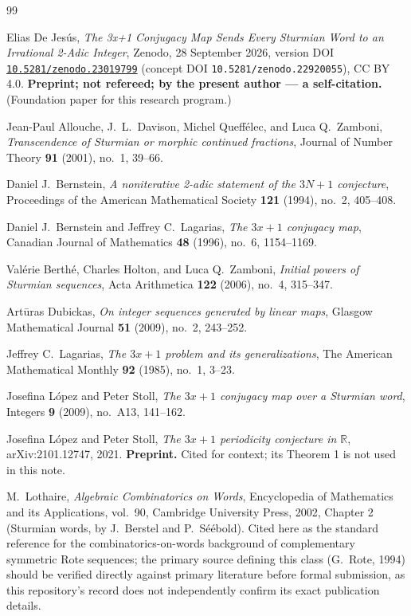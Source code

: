 \documentclass[11pt]{article}
\begin{document}
\begin{thebibliography}{99}

 Elias De Jesús, \emph{The 3x+1 Conjugacy Map Sends Every Sturmian Word to an Irrational 2-Adic Integer}, Zenodo, 28 September 2026, version DOI \href{https://doi.org/10.5281/zenodo.23019799}{\texttt{10.5281/zenodo.23019799}} (concept DOI \texttt{10.5281/zenodo.22920055}), CC BY 4.0. \textbf{Preprint; not refereed; by the present author --- a self-citation.} (Foundation paper for this research program.)

 Jean-Paul Allouche, J.\ L.\ Davison, Michel Queffélec, and Luca Q.\ Zamboni, \emph{Transcendence of Sturmian or morphic continued fractions}, Journal of Number Theory \textbf{91} (2001), no.\ 1, 39--66.

 Daniel J.\ Bernstein, \emph{A noniterative 2-adic statement of the $3N+1$ conjecture}, Proceedings of the American Mathematical Society \textbf{121} (1994), no.\ 2, 405--408.

 Daniel J.\ Bernstein and Jeffrey C.\ Lagarias, \emph{The $3x+1$ conjugacy map}, Canadian Journal of Mathematics \textbf{48} (1996), no.\ 6, 1154--1169.

 Valérie Berthé, Charles Holton, and Luca Q.\ Zamboni, \emph{Initial powers of Sturmian sequences}, Acta Arithmetica \textbf{122} (2006), no.\ 4, 315--347.

 Artūras Dubickas, \emph{On integer sequences generated by linear maps}, Glasgow Mathematical Journal \textbf{51} (2009), no.\ 2, 243--252.

 Jeffrey C.\ Lagarias, \emph{The $3x+1$ problem and its generalizations}, The American Mathematical Monthly \textbf{92} (1985), no.\ 1, 3--23.

 Josefina López and Peter Stoll, \emph{The $3x+1$ conjugacy map over a Sturmian word}, Integers \textbf{9} (2009), no.\ A13, 141--162.

 Josefina López and Peter Stoll, \emph{The $3x+1$ periodicity conjecture in $\mathbb{R}$}, arXiv:2101.12747, 2021. \textbf{Preprint.} Cited for context; its Theorem 1 is not used in this note.

 M.\ Lothaire, \emph{Algebraic Combinatorics on Words}, Encyclopedia of Mathematics and its Applications, vol.\ 90, Cambridge University Press, 2002, Chapter 2 (Sturmian words, by J.\ Berstel and P.\ Séébold). Cited here as the standard reference for the combinatorics-on-words background of complementary symmetric Rote sequences; the primary source defining this class (G.\ Rote, 1994) should be verified directly against primary literature before formal submission, as this repository's record does not independently confirm its exact publication details.


\end{thebibliography}
\end{document}
